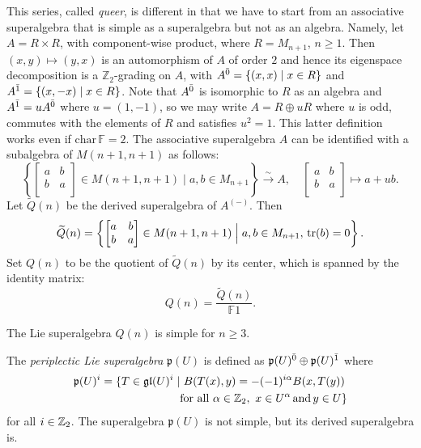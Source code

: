 This series, called \emph{queer}, is different in that we have to start from an associative superalgebra that is simple as a superalgebra but not as an algebra. Namely, let $A=R\times R$, with component-wise product, where $R=M_{n+1}$, $n\ge 1$. Then $(x,y)\mapsto(y,x)$ is an automorphism of $A$ of order $2$ and hence its eigenspace decomposition is a $\mathbb{Z}_2$-grading on $A$, with $A^{\bar{0}}=\{(x,x)\;|\;x\in R\}$ and $A^{\bar{1}}=\{(x,-x)\;|\;x\in R\}$. Note that $A^{\bar{0}}$ is isomorphic to $R$ as an algebra and $A^{\bar{1}}=uA^{\bar{0}}$ where $u=(1,-1)$, so we may write $A=R\oplus uR$ where $u$ is odd, commutes with the elements of $R$ and satisfies $u^2=1$. This latter definition works even if $\mathrm{char}\,\mathbb{F}=2$. The associative superalgebra $A$ can be identified with a subalgebra of $M(n+1,n+1)$ as follows:
\[
\left\{
\left[
\begin{matrix}  
  a & b \\
  b & a \\  
  \end{matrix}
\right] \in M(n+1,n+1) \; \Big| \;
a,b \in M_{n+1} \right\}\stackrel{\sim}{\to}A,\quad 
\left[\begin{matrix}  
  a & b \\
  b & a \\  
  \end{matrix}\right]\mapsto a+ub.
\] 
Let $\widetilde{Q}(n)$ be the derived superalgebra of $A^{(-)}$. Then 
\[
\widetilde{Q} (n) = \left\{
\left[
\begin{matrix}  
  a & b \\
  b & a \\  
  \end{matrix}
\right] \in M(n+1,n+1) \; \Big| \;
a,b \in M_{n+1},\,\operatorname{tr}(b)=0 \right\}.
\] 
Set $Q(n)$ to be the quotient of $\widetilde{Q}(n)$ by its center, which is spanned by the identity matrix:
\[
Q(n)=\frac{\widetilde{Q} (n)}{\mathbb{F}1}.
\]

The Lie superalgebra $Q(n)$ is simple for $n\geq 3$.

The \emph{periplectic Lie superalgebra} $\mathfrak{p}(U)$ is defined as $\mathfrak{p}(U)^{\bar0} \oplus \mathfrak{p}(U)^{\bar1}$ where \[\begin{aligned}
    \mathfrak{p}(U)^{i} = \{T\in \mathfrak{gl}(U)^i\mid&\,\, B(T(x),y) = - (-1)^{i\alpha}B(x,T(y))\\ &\text{for all}\,\,\alpha\in\mathbb{Z}_{2},\,\, x\in U^{\alpha} \,\text{and}\, y\in U\}\end{aligned}\] for all $i\in\mathbb{Z}_{2}$. The superalgebra $\mathfrak{p}(U)$ is not simple, but its derived superalgebra is.

